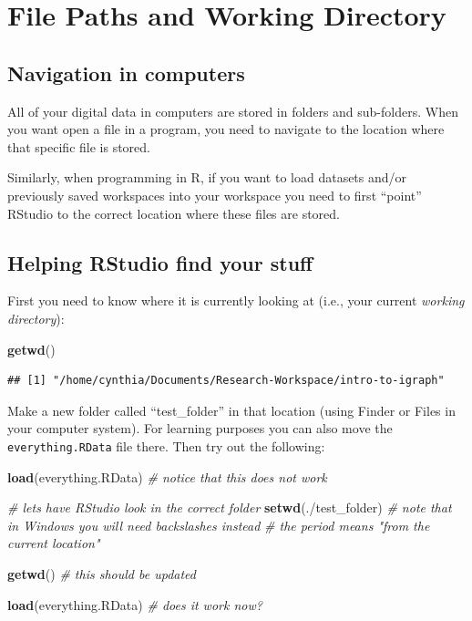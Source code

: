 \documentclass[
]{book}
\newenvironment{Shaded}{\begin{snugshade}}{\end{snugshade}}
\newcommand{\CommentTok}[1]{\textcolor[rgb]{0.56,0.35,0.01}{\textit{#1}}}
\newcommand{\FunctionTok}[1]{\textcolor[rgb]{0.13,0.29,0.53}{\textbf{#1}}}
\newcommand{\NormalTok}[1]{#1}
\newcommand{\StringTok}[1]{\textcolor[rgb]{0.31,0.60,0.02}{#1}}
\begin{document}
\section{File Paths and Working Directory}\label{file-paths-and-working-directory}

\subsection{Navigation in computers}\label{navigation-in-computers}

All of your digital data in computers are stored in folders and sub-folders. When you want open a file in a program, you need to navigate to the location where that specific file is stored.

Similarly, when programming in R, if you want to load datasets and/or previously saved workspaces into your workspace you need to first ``point'' RStudio to the correct location where these files are stored.

\subsection{Helping RStudio find your stuff}\label{helping-rstudio-find-your-stuff}

First you need to know where it is currently looking at (i.e., your current \emph{working directory}):

\begin{Shaded}
\begin{Highlighting}[]
\FunctionTok{getwd}\NormalTok{()}
\end{Highlighting}
\end{Shaded}

\begin{verbatim}
## [1] "/home/cynthia/Documents/Research-Workspace/intro-to-igraph"
\end{verbatim}

Make a new folder called ``test\_folder'' in that location (using Finder or Files in your computer system). For learning purposes you can also move the \texttt{everything.RData} file there. Then try out the following:

\begin{Shaded}
\begin{Highlighting}[]
\FunctionTok{load}\NormalTok{(}\StringTok{\textquotesingle{}everything.RData\textquotesingle{}}\NormalTok{) }\CommentTok{\# notice that this does not work }

\CommentTok{\# let\textquotesingle{}s have RStudio look in the correct folder }
\FunctionTok{setwd}\NormalTok{(}\StringTok{\textquotesingle{}./test\_folder\textquotesingle{}}\NormalTok{) }\CommentTok{\# note that in Windows you will need backslashes instead}
\CommentTok{\# the period means "from the current location"}

\FunctionTok{getwd}\NormalTok{() }\CommentTok{\# this should be updated }

\FunctionTok{load}\NormalTok{(}\StringTok{\textquotesingle{}everything.RData\textquotesingle{}}\NormalTok{) }\CommentTok{\# does it work now? }
\end{Highlighting}
\end{Shaded}
\end{document}
